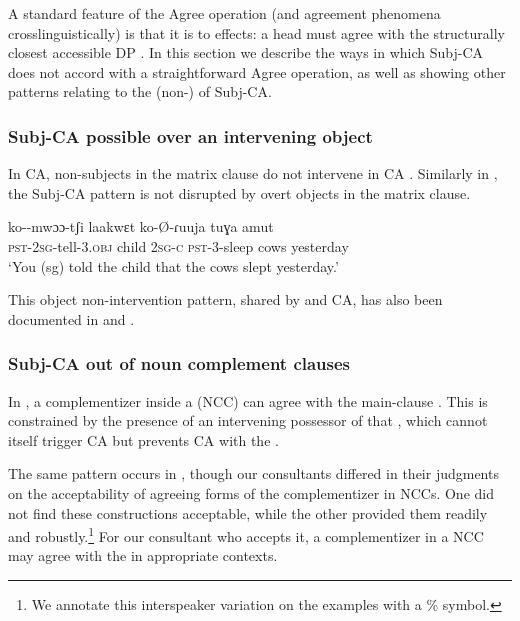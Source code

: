 \documentclass[output=paper
,newtxmath
,modfonts
,nonflat]{langsci/langscibook}
\begin{document}
A standard feature of the Agree operation (and agreement phenomena crosslinguistically) is that it is  to  effects: a head must agree with the structurally closest accessible DP \parencite{Chomsky:2000,Chomsky:2001}. In this section we describe the ways in which  Subj-CA does not accord with a straightforward Agree operation, as well as showing other patterns relating to the (non-)  of Subj-CA. 

\subsubsection{Subj-CA possible over an intervening object}

In  CA, non-subjects in the matrix clause do not intervene in CA \citep{Diercks:2013}. Similarly in , the Subj-CA pattern is not disrupted by overt objects in the matrix clause. 

\ea
\gll ko--mwɔɔ-tʃi laakwɛt  ko-\O-ɾuuja tuɣa amut \\
\textsc{pst}-2\textsc{sg}-tell-3.\textsc{obj} child 2\textsc{sg-c} \textsc{pst}-3-sleep cows yesterday \\
\glt `You (sg) told the child that the cows slept yesterday.'
\z

\noindent This object non-intervention pattern, shared by  and  CA, has also been documented in  \citep{Torrence:2016} and  \citep{LetsholoSafir:2017}.

\subsubsection{Subj-CA out of noun complement clauses} \label{NCCSection}

\noindent In , a complementizer inside a  (NCC) can agree with the main-clause . This is constrained by the presence of an intervening possessor of that , which cannot itself trigger CA but prevents CA with the   \citep[378]{Diercks:2013}. 

The same pattern occurs in , though our consultants differed in their judgments on the acceptability of agreeing forms of the complementizer in NCCs. One did not find these constructions acceptable, while the other provided them readily and robustly.\footnote{We annotate this interspeaker variation on the examples with a \% symbol.} For our consultant who accepts it, a complementizer in a NCC may agree with the   in appropriate contexts. 
\end{document}
